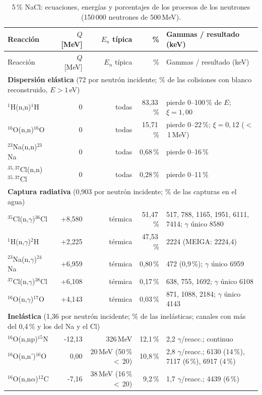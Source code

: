 \documentclass[11pt,a4paper]{article}
\begin{document}
{\footnotesize\begin{longtable}{p{4.4cm}rrrp{4.6cm}}
\caption{5\,\% NaCl: ecuaciones, energías y porcentajes de los procesos de los neutrones (150\,000 neutrones de 500\,MeV).}\label{tab:procesos_nacl5}\\\toprule
Reacción & $Q$ [MeV] & $E_n$ típica & \% & Gammas / resultado (keV) \\\midrule\endfirsthead
\toprule Reacción & $Q$ [MeV] & $E_n$ típica & \% & Gammas / resultado (keV) \\\midrule\endhead
\multicolumn{5}{l}{\textbf{Dispersión elástica} (72 por neutrón incidente; \% de las colisiones con blanco reconstruido, $E>1$\,eV)}\\
$^1$H(n,n)$^1$H & 0 & todas & 83,33\,\% & pierde 0--100\,\% de $E$; $\xi = 1{,}00$ \\
$^{16}$O(n,n)$^{16}$O & 0 & todas & 15,71\,\% & pierde 0--22\,\%; $\xi = 0{,}12$ ($<$\,1\,MeV) \\
$^{23}$Na(n,n)$^{23}$Na & 0 & todas & 0,68\,\% & pierde 0--16\,\% \\
$^{35,37}$Cl(n,n)$^{35,37}$Cl & 0 & todas & 0,28\,\% & pierde 0--11\,\% \\
\midrule\multicolumn{5}{l}{\textbf{Captura radiativa} (0,903 por neutrón incidente; \% de las capturas en el agua)}\\
$^{35}$Cl(n,$\gamma$)$^{36}$Cl & +8,580 & térmica & 51,47\,\% & 517, 788, 1165, 1951, 6111, 7414; $\gamma$ único 8580 \\
$^1$H(n,$\gamma$)$^2$H & +2,225 & térmica & 47,53\,\% & 2224 (MEIGA: 2224,4) \\
$^{23}$Na(n,$\gamma$)$^{24}$Na & +6,959 & térmica & 0,80\,\% & 472 (0,9\,\%); $\gamma$ único 6959 \\
$^{37}$Cl(n,$\gamma$)$^{38}$Cl & +6,108 & térmica & 0,17\,\% & 638, 755, 1692; $\gamma$ único 6108 \\
$^{16}$O(n,$\gamma$)$^{17}$O & +4,143 & térmica & 0,03\,\% & 871, 1088, 2184; $\gamma$ único 4143 \\
\midrule\multicolumn{5}{l}{\textbf{Inelástica} (1,36 por neutrón incidente; \% de las inelásticas; canales con más del 0,4\,\% y los del Na y el Cl)}\\
$^{16}$O(n,np)$^{15}$N & -12,13 & 326\,MeV & 12,1\,\% & 2,2 $\gamma$/reacc.; continuo \\
$^{16}$O(n,n')$^{16}$O & 0,00 & 20\,MeV (50\,\% $<$\,20) & 10,8\,\% & 2,8 $\gamma$/reacc.; 6130 (14\,\%), 7117 (6\,\%), 6917 (4\,\%) \\
$^{16}$O(n,n$\alpha$)$^{12}$C & -7,16 & 38\,MeV (16\,\% $<$\,20) & 9,2\,\% & 1,7 $\gamma$/reacc.; 4439 (6\,\%) \\

\end{longtable}}
\end{document}
